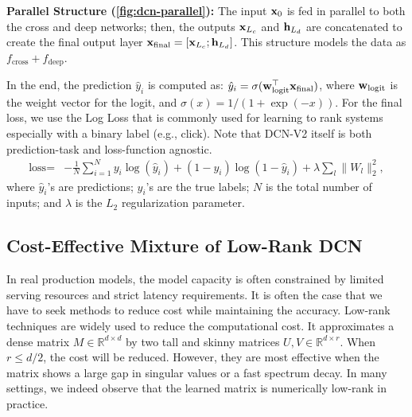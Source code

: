 \documentclass[sigconf]{acmart}
\newcommand{\vecx}{{\bf x}}
\newcommand{\vecw}{{\bf w}}
\newcommand{\vech}{{\bf h}}
\begin{document}
{\bf Parallel Structure (\autoref{fig:dcn-parallel}):} The input $\vecx_0$ is fed in parallel to both the cross and deep networks; then, the outputs $\vecx_{L_c}$ and $\vech_{L_d}$ are concatenated to create the final output layer $\vecx_{\text{final}} = [\vecx_{L_c}; \vech_{L_d}]$. This structure models the data as $f_{\text{cross}} + f_{\text{deep}}$.




In the end, the prediction $\hat y_i$ is computed as:
$\hat y_i = \sigma(\vecw_{\text{logit}}^\top\vecx_{\text{final} })$,
where $\vecw_{\text{logit}}$ is the weight vector for the logit, and $\sigma(x) = 1 / (1 + \exp(-x))$. For the final loss, we use the Log Loss that is commonly used for learning to rank systems especially with a binary label (e.g., click). Note that {DCN-V2} itself is both prediction-task and loss-function agnostic.
\begin{equation*}
	\begin{split}
	\text{loss} = &-\frac{1}{N} \sum_{i = 1}^N y_i \log(\hat y_i) + (1 - y_i) \log(1 - \hat y_i) + 
    \lambda \sum_l \|W_l\|^2_2,
    \end{split}
\end{equation*}
where $\hat y_i$'s are predictions; $y_i$'s are the true labels; $N$ is the total number of inputs; and $\lambda$ is the $L_2$ regularization parameter. 

\subsection{Cost-Effective Mixture of Low-Rank DCN}
In real production models, the model capacity is often constrained by limited serving resources and strict latency requirements. It is often the case that we have to seek methods to reduce cost while maintaining the accuracy. Low-rank techniques \cite{golub1996matrix} are widely used \cite{jaderberg2014speeding, yu2017compressing, chen2018adaptive, wang2019block, halko2011finding, drineas2005nystrom} to reduce the computational cost. It approximates a dense matrix $M \in \mathbb{R}^{d \times d}$ by two tall and skinny matrices $U, V \in \mathbb{R}^{d \times r}$. When $r \le d/2$, the cost will be reduced. However, they are most effective when the matrix shows a large gap in singular values or a fast spectrum decay. In many settings, we indeed observe that the learned matrix is numerically low-rank in practice.
\end{document}
